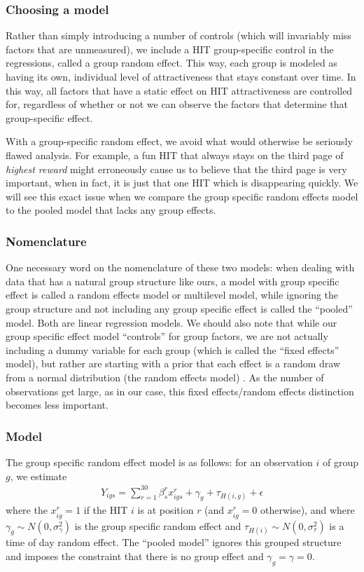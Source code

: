 \documentclass{acm_proc_article-sp}
\begin{document}
\subsubsection{Choosing a model}
Rather than simply introducing a number of controls (which will
invariably miss factors that are unmeasured), we include a HIT
group-specific control in the regressions, called a group random
effect. This way, each group is modeled as having its own,
individual level of attractiveness that stays constant over time. In
this way, all factors that have a static effect on HIT
attractiveness are controlled for, regardless of whether or not we can
observe the factors that determine that group-specific effect.

With a group-specific random effect, we avoid what would otherwise be
seriously flawed analysis. For example, a fun HIT that always stays on
the third page of {\em highest reward} might erroneously cause us to
believe that the third page is very important, when in fact, it is
just that one HIT which is disappearing quickly. We will see this
exact issue when we compare the group specific random effects model to
the pooled model that lacks any group effects.

\subsubsection{Nomenclature}
One necessary word on the nomenclature of these two models: when
dealing with data that has a natural group structure like ours, a
model with group specific effect is called a random effects model or
multilevel model, while ignoring the group structure and not including
any group specific effect is called the ``pooled'' model. Both are
linear regression models. We should also note that while our group
specific effect model ``controls'' for group factors, we are not
actually including a dummy variable for each group (which is called
the ``fixed effects'' model), but rather are starting with a prior
that each effect is a random draw from a normal distribution (the
random effects model) \cite{gelman2007data}. As the number of
observations get large, as in our case, this fixed effects/random
effects distinction becomes less important.

\subsubsection{Model}
The group specific random effect model is as follows: for an
observation $i$ of group $g$, we estimate 
\begin{align} \label{eq:groups}
Y_{igs} = \sum_{r=1}^{30}\beta^r_s x^r_{igs} + \gamma_g + \tau_{H(i,g)} + \epsilon
\end{align} 
where the $x^r_{ig}=1$ if the HIT $i$ is at position $r$ (and
$x^r_{ig}=0$ otherwise), and where $\gamma_g \sim
N(0,\sigma_\gamma^2)$ is the group specific random effect and
$\tau_{H(i)} \sim N(0,\sigma^2_\tau)$ is a time of day random
effect. The ``pooled model'' ignores this grouped structure and
imposes the constraint that there is no group effect and $\gamma_g =
\gamma = 0$.
\end{document}
